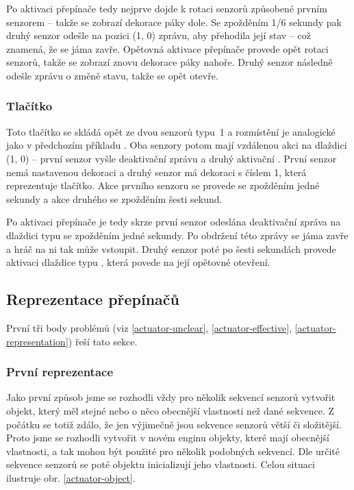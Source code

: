 Po aktivaci přepínače tedy nejprve dojde k rotaci senzorů způsobené prvním senzorem -- takže se zobrazí dekorace páky dole.
Se zpožděním 1/6 sekundy pak druhý senzor odešle  na pozici (1, 0) zprávu, aby přehodila její stav -- což znamená, že se jáma zavře.
Opětovná aktivace přepínače provede opět rotaci senzorů, takže se zobrazí znovu dekorace páky nahoře. Druhý senzor následně odešle  zprávu 
o změně stavu, takže se  opět otevře.



\subsubsection{Tlačítko}

Toto tlačítko se skládá opět ze dvou senzorů typu~1 a rozmístění je analogické jako v předchozím příkladu .
Oba senzory potom mají vzdálenou akci na dlaždici (1, 0) -- první senzor vyšle deaktivační zprávu a druhý aktivační .
První senzor nemá nastavenou dekoraci a druhý senzor má dekoraci s číslem 1, která reprezentuje tlačítko. Akce prvního senzoru
se provede se zpožděním jedné sekundy a akce druhého se zpožděním šesti sekund. 

Po aktivaci přepínače je tedy skrze první senzor odeslána deaktivační zpráva na dlaždici typu  se zpožděním jedné sekundy.
Po obdržení této zprávy se jáma zavře a hráč na ni tak může vstoupit.  Druhý senzor poté po šesti sekundách provede 
aktivaci dlaždice typu , která povede na její opětovné otevření.



\subsection{Reprezentace přepínačů}
První tři body problémů  (viz \ref{actuator-unclear}, \ref{actuator-effective}, \ref{actuator-representation}) řeší tato sekce.

\subsubsection{První reprezentace}\label{rep-v1}

Jako první způsob jsme se rozhodli vždy pro několik sekvencí senzorů vytvořit objekt, který měl stejné nebo o něco obecnější vlastnosti než dané sekvence.
Z počátku se totiž zdálo, že jen výjimečně jsou sekvence senzorů větší či složitější. Proto jsme se rozhodli vytvořit v
novém enginu objekty, které mají obecnější vlastnosti, a tak mohou být použité pro několik podobných sekvencí. Dle určité sekvence senzorů se poté
objektu inicializují jeho vlastnosti. Celou situaci ilustruje obr. \ref{actuator-object}.

